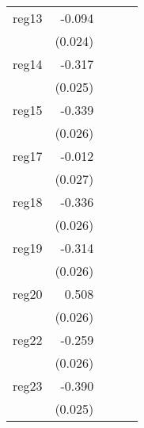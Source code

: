 {\begin{longtable}{l*{4}{D{.}{.}{-1}}}
\addlinespace
reg13       &      -0.094\sym{***}&                     &                     &                     \\
            &     (0.024)         &                     &                     &                     \\
\addlinespace
reg14       &      -0.317\sym{***}&                     &                     &                     \\
            &     (0.025)         &                     &                     &                     \\
\addlinespace
reg15       &      -0.339\sym{***}&                     &                     &                     \\
            &     (0.026)         &                     &                     &                     \\
\addlinespace
reg17       &      -0.012         &                     &                     &                     \\
            &     (0.027)         &                     &                     &                     \\
\addlinespace
reg18       &      -0.336\sym{***}&                     &                     &                     \\
            &     (0.026)         &                     &                     &                     \\
\addlinespace
reg19       &      -0.314\sym{***}&                     &                     &                     \\
            &     (0.026)         &                     &                     &                     \\
\addlinespace
reg20       &       0.508\sym{***}&                     &                     &                     \\
            &     (0.026)         &                     &                     &                     \\
\addlinespace
reg22       &      -0.259\sym{***}&                     &                     &                     \\
            &     (0.026)         &                     &                     &                     \\
\addlinespace
reg23       &      -0.390\sym{***}&                     &                     &                     \\
            &     (0.025)         &                     &                     &                     \\

\end{longtable}}
